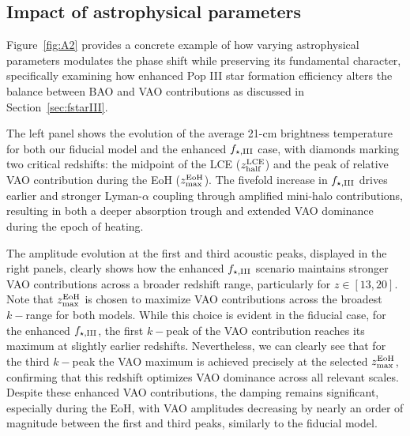 \documentclass[floats,floatfix,showpacs,amssymb,prd,twocolumn,superscriptaddress,nofootinbib,reprint,preprintnumbers]{revtex4-2}
\begin{document}
\subsection{ Impact of astrophysical parameters} 
\noindent Figure~\ref{fig:A2} provides a concrete example of how varying astrophysical parameters modulates the phase shift while preserving its fundamental character, specifically examining how enhanced Pop III star formation efficiency alters the balance between BAO and VAO contributions as discussed in Section~\ref{sec:fstarIII}.

The left panel shows the evolution of the average 21-cm brightness temperature for both our fiducial model and the enhanced $f_{\star,\rm III}$ case, with diamonds marking two critical redshifts: the midpoint of the LCE ($z_{\rm half}^{\rm LCE}$) and the peak of relative VAO contribution during the EoH ($z_{\rm max}^{\rm EoH}$). The fivefold increase in $f_{\star,\rm III}$ drives earlier and stronger Lyman-$\alpha$ coupling through amplified mini-halo contributions, resulting in both a deeper absorption trough and extended VAO dominance during the epoch of heating.

The amplitude evolution at the first and third acoustic peaks, displayed in the right panels, clearly shows how the enhanced $f_{\star,\rm III}$ scenario maintains stronger VAO contributions across a broader redshift range, particularly for $z\in [13,20]$.  Note that $z_{\rm max}^{\rm EoH}$ is chosen to maximize VAO contributions across the broadest $k-$range for both models. While this choice is evident in the fiducial case, for the enhanced $f_{\star,\rm III}$, the first $k-$peak of the VAO contribution reaches its maximum at slightly earlier redshifts. Nevertheless, we can clearly see that for the third $k-$peak the VAO maximum is achieved precisely at the selected $z_{\rm max}^{\rm EoH}$, confirming that this redshift optimizes VAO dominance across all relevant scales. Despite these enhanced VAO contributions, the damping remains significant, especially during the EoH, with VAO amplitudes decreasing by nearly an order of magnitude between the first and third peaks, similarly to the fiducial model.
\vspace{-.5cm}


\end{document}
